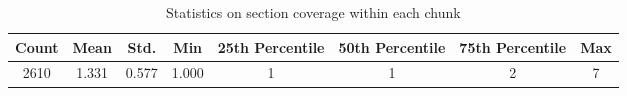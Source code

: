 \begin{table}[H]
\centering
\begin{tabular}{@{}cccccccc@{}}
\toprule
Count & Mean  & Std.  & Min   & 25th Percentile & 50th Percentile & 75th Percentile & Max \\ \midrule
2610  & 1.331 & 0.577 & 1.000 & 1               & 1               & 2               & 7   \\ \bottomrule
\end{tabular}
\caption{Statistics on section coverage within each chunk}
\label{table: chunking_map_stats}
\end{table}





% 
% 


% 
% 

